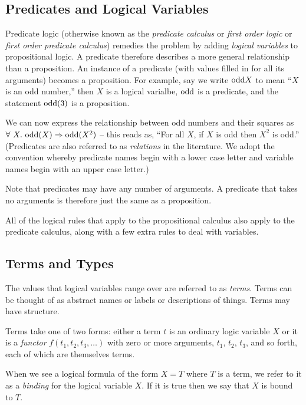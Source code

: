 \subsection{Predicates and Logical Variables}

Predicate logic (otherwise known as the \emph{predicate calculus} or
\emph{first order logic} or \emph{first order predicate calculus})
remedies the problem by adding \emph{logical variables} to propositional
logic.  A predicate therefore describes a more general relationship than
a proposition.  An instance of a predicate (\ie with values filled in
for all its arguments) becomes a proposition.  For example, say we write
$\text{odd}{X}$ to mean ``$X$ is an odd number,'' then $X$ is a logical
varialbe, $\text{odd}$ is a predicate, and the statement $\text{odd}(3)$ is a
proposition.

We can now express the relationship between odd numbers and their
squares as
$\forall\ X.\ \text{odd}(X) \Rightarrow \text{odd}(X^2)$ -- this reads as, ``For all $X$, if
$X$ is odd then $X^2$ is odd.''
(Predicates are also referred to as \emph{relations} in the literature.
We adopt the convention whereby predicate names begin with a lower case
letter and variable names begin with an upper case letter.)

Note that predicates may have any number of arguments.  A predicate that
takes no arguments is therefore just the same as a proposition.

All of the logical rules that apply to the propositional calculus also
apply to the predicate calculus, along with a few extra rules to deal
with variables.

\subsection{Terms and Types}

The values that logical variables range over are referred to as
\emph{terms}.  Terms can be thought of as abstract names or labels or
descriptions of things.  Terms may have structure.

Terms take one of two forms: either a term $t$ is an ordinary logic
variable $X$ or it is a \emph{functor} $f(t_1, t_2, t_3, \ldots)$
with zero or more arguments, $t_1$, $t_2$, $t_3$, and so forth, each of
which are themselves terms.

When we see a logical formula of the form $X = T$ where $T$ is a term,
we refer to it as a \emph{binding} for the logical variable $X$.  If it
is true then we say that $X$ is bound to $T$.


